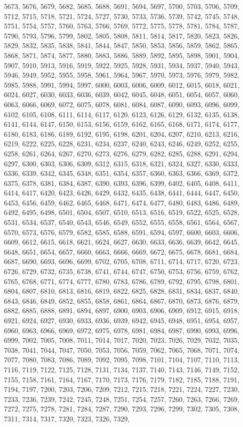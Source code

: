 \documentclass[../Cours.tex]{subfiles}
\begin{document}
\begin{questions}
5673, 5676, 5679, 5682, 5685, 5688, 5691, 5694, 5697, 5700, 5703, 5706, 5709, 5712, 5715, 5718, 5721, 5724, 5727, 5730, 5733, 5736, 5739, 5742, 5745, 5748, 5751, 5754, 5757, 5760, 5763, 5766, 5769, 5772, 5775, 5778, 5781, 5784, 5787, 5790, 5793, 5796, 5799, 5802, 5805, 5808, 5811, 5814, 5817, 5820, 5823, 5826, 5829, 5832, 5835, 5838, 5841, 5844, 5847, 5850, 5853, 5856, 5859, 5862, 5865, 5868, 5871, 5874, 5877, 5880, 5883, 5886, 5889, 5892, 5895, 5898, 5901, 5904, 5907, 5910, 5913, 5916, 5919, 5922, 5925, 5928, 5931, 5934, 5937, 5940, 5943, 5946, 5949, 5952, 5955, 5958, 5961, 5964, 5967, 5970, 5973, 5976, 5979, 5982, 5985, 5988, 5991, 5994, 5997, 6000, 6003, 6006, 6009, 6012, 6015, 6018, 6021, 6024, 6027, 6030, 6033, 6036, 6039, 6042, 6045, 6048, 6051, 6054, 6057, 6060, 6063, 6066, 6069, 6072, 6075, 6078, 6081, 6084, 6087, 6090, 6093, 6096, 6099, 6102, 6105, 6108, 6111, 6114, 6117, 6120, 6123, 6126, 6129, 6132, 6135, 6138, 6141, 6144, 6147, 6150, 6153, 6156, 6159, 6162, 6165, 6168, 6171, 6174, 6177, 6180, 6183, 6186, 6189, 6192, 6195, 6198, 6201, 6204, 6207, 6210, 6213, 6216, 6219, 6222, 6225, 6228, 6231, 6234, 6237, 6240, 6243, 6246, 6249, 6252, 6255, 6258, 6261, 6264, 6267, 6270, 6273, 6276, 6279, 6282, 6285, 6288, 6291, 6294, 6297, 6300, 6303, 6306, 6309, 6312, 6315, 6318, 6321, 6324, 6327, 6330, 6333, 6336, 6339, 6342, 6345, 6348, 6351, 6354, 6357, 6360, 6363, 6366, 6369, 6372, 6375, 6378, 6381, 6384, 6387, 6390, 6393, 6396, 6399, 6402, 6405, 6408, 6411, 6414, 6417, 6420, 6423, 6426, 6429, 6432, 6435, 6438, 6441, 6444, 6447, 6450, 6453, 6456, 6459, 6462, 6465, 6468, 6471, 6474, 6477, 6480, 6483, 6486, 6489, 6492, 6495, 6498, 6501, 6504, 6507, 6510, 6513, 6516, 6519, 6522, 6525, 6528, 6531, 6534, 6537, 6540, 6543, 6546, 6549, 6552, 6555, 6558, 6561, 6564, 6567, 6570, 6573, 6576, 6579, 6582, 6585, 6588, 6591, 6594, 6597, 6600, 6603, 6606, 6609, 6612, 6615, 6618, 6621, 6624, 6627, 6630, 6633, 6636, 6639, 6642, 6645, 6648, 6651, 6654, 6657, 6660, 6663, 6666, 6669, 6672, 6675, 6678, 6681, 6684, 6687, 6690, 6693, 6696, 6699, 6702, 6705, 6708, 6711, 6714, 6717, 6720, 6723, 6726, 6729, 6732, 6735, 6738, 6741, 6744, 6747, 6750, 6753, 6756, 6759, 6762, 6765, 6768, 6771, 6774, 6777, 6780, 6783, 6786, 6789, 6792, 6795, 6798, 6801, 6804, 6807, 6810, 6813, 6816, 6819, 6822, 6825, 6828, 6831, 6834, 6837, 6840, 6843, 6846, 6849, 6852, 6855, 6858, 6861, 6864, 6867, 6870, 6873, 6876, 6879, 6882, 6885, 6888, 6891, 6894, 6897, 6900, 6903, 6906, 6909, 6912, 6915, 6918, 6921, 6924, 6927, 6930, 6933, 6936, 6939, 6942, 6945, 6948, 6951, 6954, 6957, 6960, 6963, 6966, 6969, 6972, 6975, 6978, 6981, 6984, 6987, 6990, 6993, 6996, 6999, 7002, 7005, 7008, 7011, 7014, 7017, 7020, 7023, 7026, 7029, 7032, 7035, 7038, 7041, 7044, 7047, 7050, 7053, 7056, 7059, 7062, 7065, 7068, 7071, 7074, 7077, 7080, 7083, 7086, 7089, 7092, 7095, 7098, 7101, 7104, 7107, 7110, 7113, 7116, 7119, 7122, 7125, 7128, 7131, 7134, 7137, 7140, 7143, 7146, 7149, 7152, 7155, 7158, 7161, 7164, 7167, 7170, 7173, 7176, 7179, 7182, 7185, 7188, 7191, 7194, 7197, 7200, 7203, 7206, 7209, 7212, 7215, 7218, 7221, 7224, 7227, 7230, 7233, 7236, 7239, 7242, 7245, 7248, 7251, 7254, 7257, 7260, 7263, 7266, 7269, 7272, 7275, 7278, 7281, 7284, 7287, 7290, 7293, 7296, 7299, 7302, 7305, 7308, 7311, 7314, 7317, 7320, 7323, 7326, 7329, 
\end{questions}
\end{document}
